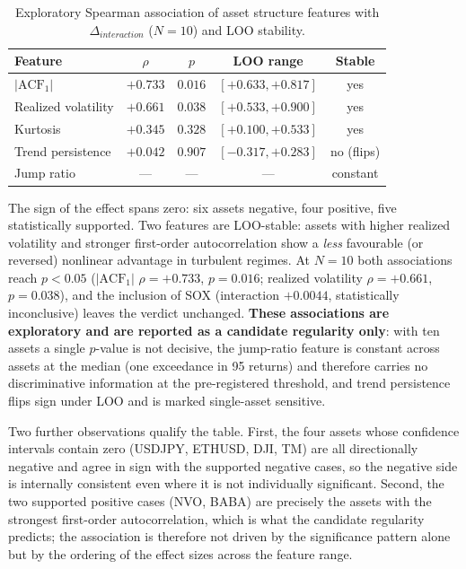 \documentclass[conference]{IEEEtran}
\begin{document}
\begin{table}[!t]
\caption{Exploratory Spearman association of asset structure features with
$\Delta_{interaction}$ ($N=10$) and LOO stability.}
\label{tab:assoc}
\centering
\small
\begin{tabular}{@{}lcccc@{}}
\toprule
Feature & $\rho$ & $p$ & LOO range & Stable \\
\midrule
$|\mathrm{ACF}_1|$  & $+0.733$ & $0.016$ & $[+0.633,+0.817]$ & yes \\
Realized volatility & $+0.661$ & $0.038$ & $[+0.533,+0.900]$ & yes \\
Kurtosis            & $+0.345$ & $0.328$ & $[+0.100,+0.533]$ & yes \\
Trend persistence   & $+0.042$ & $0.907$ & $[-0.317,+0.283]$ & no (flips) \\
Jump ratio          & ---      & ---     & --- & constant \\
\bottomrule
\end{tabular}
\end{table}

The sign of the effect spans zero: six assets negative, four positive, five statistically
supported. Two features are LOO-stable: assets with higher realized volatility and stronger
first-order autocorrelation show a \emph{less} favourable (or reversed) nonlinear advantage in
turbulent regimes. At $N{=}10$ both associations reach $p<0.05$ ($|\mathrm{ACF}_1|$
$\rho=+0.733$, $p=0.016$; realized volatility $\rho=+0.661$, $p=0.038$), and the inclusion of
SOX (interaction $+0.0044$, statistically inconclusive) leaves the verdict unchanged.
\textbf{These associations are exploratory and are reported as a candidate regularity only}: with
ten assets a single $p$-value is not decisive, the jump-ratio feature is constant across assets at
the median (one exceedance in 95 returns) and therefore carries no discriminative information at
the pre-registered threshold, and trend persistence flips sign under LOO and is marked
single-asset sensitive.

Two further observations qualify the table. First, the four assets whose confidence intervals
contain zero (USDJPY, ETHUSD, DJI, TM) are all directionally negative and agree in sign with the
supported negative cases, so the negative side is internally consistent even where it is not
individually significant. Second, the two supported positive cases (NVO, BABA) are precisely the
assets with the strongest first-order autocorrelation, which is what the candidate regularity
predicts; the association is therefore not driven by the significance pattern alone but by the
ordering of the effect sizes across the feature range.
\end{document}
